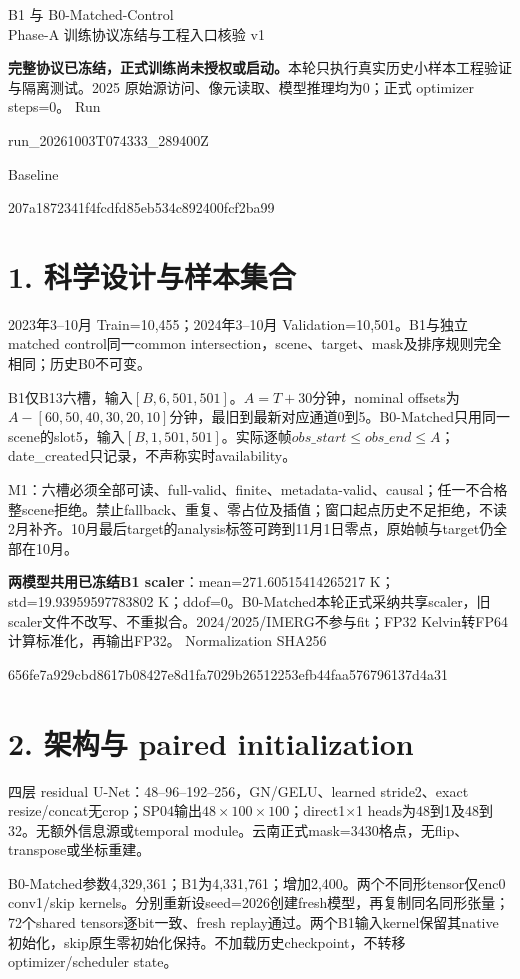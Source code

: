 \documentclass[10pt,a4paper,fontset=windows]{ctexart}
\begin{document}
\begin{center}{\Large B1 与 B0-Matched-Control}\\[5pt]
{\large Phase-A 训练协议冻结与工程入口核验 v1}\end{center}
\textbf{完整协议已冻结，正式训练尚未授权或启动。}本轮只执行真实历史小样本工程验证与隔离测试。2025 原始源访问、像元读取、模型推理均为0；正式 optimizer steps=0。
\noindent Run\par{\small\ttfamily run\_20261003T074333\_289400Z}\par
\noindent Baseline\par{\small\ttfamily 207a1872341f4fcdfd85eb534c892400fcf2ba99}\par
\section*{1. 科学设计与样本集合}
2023年3--10月 Train=10,455；2024年3--10月 Validation=10,501。B1与独立matched control同一common intersection，scene、target、mask及排序规则完全相同；历史B0不可变。

B1仅B13六槽，输入$[B,6,501,501]$。$A=T+30$分钟，nominal offsets为$A-[60,50,40,30,20,10]$分钟，最旧到最新对应通道0到5。B0-Matched只用同一scene的slot5，输入$[B,1,501,501]$。实际逐帧$obs\_start\le obs\_end\le A$；date\_created只记录，不声称实时availability。

M1：六槽必须全部可读、full-valid、finite、metadata-valid、causal；任一不合格整scene拒绝。禁止fallback、重复、零占位及插值；窗口起点历史不足拒绝，不读2月补齐。10月最后target的analysis标签可跨到11月1日零点，原始帧与target仍全部在10月。

\textbf{两模型共用已冻结B1 scaler}：mean=271.60515414265217 K；std=19.93959597783802 K；ddof=0。B0-Matched本轮正式采纳共享scaler，旧scaler文件不改写、不重拟合。2024/2025/IMERG不参与fit；FP32 Kelvin转FP64计算标准化，再输出FP32。
\noindent Normalization SHA256\par{\small\ttfamily 656fe7a929cbd8617b08427e8d1fa7029b26512253efb44faa576796137d4a31}\par
\section*{2. 架构与 paired initialization}
四层 residual U-Net：48--96--192--256，GN/GELU、learned stride2、exact resize/concat无crop；SP04输出$48\times100\times100$；direct1$\times$1 heads为48到1及48到32。无额外信息源或temporal module。云南正式mask=3430格点，无flip、transpose或坐标重建。

B0-Matched参数4,329,361；B1为4,331,761；增加2,400。两个不同形tensor仅enc0 conv1/skip kernels。分别重新设seed=2026创建fresh模型，再复制同名同形张量；72个shared tensors逐bit一致、fresh replay通过。两个B1输入kernel保留其native初始化，skip原生零初始化保持。不加载历史checkpoint，不转移optimizer/scheduler state。
\newpage
\end{document}
